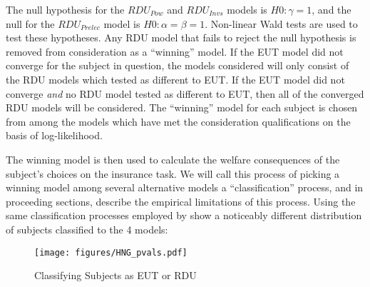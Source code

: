 \documentclass[../main.tex]{subfiles}
\begin{document}
\addtocounter{footnote}{-3}

The null hypothesis for the $\mathit{RDU_{Pow}}$ and $\mathit{RDU_{Invs}}$ models is $H0: \gamma = 1$, and the null for the $\mathit{RDU_{Prelec}}$ model is $H0: \alpha = \beta = 1$.
Non-linear Wald tests are used to test these hypotheses.
Any RDU model that fails to reject the null hypothesis is removed from consideration as a \enquote{winning} model.
If the EUT model did not converge for the subject in question, the models considered will only consist of the RDU models which tested as different to EUT.
If the EUT model did not converge \textit{and} no RDU model tested as different to EUT, then all of the converged RDU models will be considered.
The \enquote{winning} model for each subject is chosen from among the models which have met the consideration qualifications on the basis of log-likelihood.

The winning model is then used to calculate the welfare consequences of the subject's choices on the insurance task.
We will call this process of picking a winning model among several alternative models a \enquote{classification} process, and in proceeding sections, describe the empirical limitations of this process.
Using the same classification processes employed by \textcite{Harrison2016} show a noticeably different distribution of subjects classified to the 4 models:

\begin{figure}[h!]
	\center
	\caption{Classifying Subjects as EUT or RDU}
	\texttt{[image: figures/HNG\_pvals.pdf]}
	\label{fig:HNG_pvals}
\end{figure}
\end{document}
